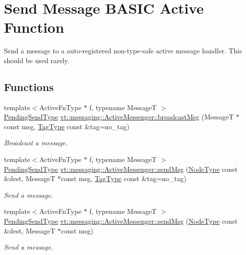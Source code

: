 \hypertarget{group__basicsend}{}\section{Send Message B\+A\+S\+IC Active Function}
\label{group__basicsend}


Send a message to a auto-\/registered non-\/type-\/safe active message handler. This should be used rarely.  


\subsection*{Functions}
\begin{DoxyCompactItemize}
\item 
{\footnotesize template$<$Active\+Fn\+Type $\ast$ f, typename MessageT $>$ }\\\hyperlink{structvt_1_1messaging_1_1_active_messenger_a3626a6ca76d8ad4ec7c3b47a2c70d3a8}{Pending\+Send\+Type} \hyperlink{group__basicsend_gaa5b764aaa06e9c9141b04f6d8a420d43}{vt\+::messaging\+::\+Active\+Messenger\+::broadcast\+Msg} (MessageT $\ast$const msg, \hyperlink{namespacevt_a84ab281dae04a52a4b243d6bf62d0e52}{Tag\+Type} const \&tag=no\+\_\+tag)
\begin{DoxyCompactList}\small\item\em Broadcast a message. \end{DoxyCompactList}\item 
{\footnotesize template$<$Active\+Fn\+Type $\ast$ f, typename MessageT $>$ }\\\hyperlink{structvt_1_1messaging_1_1_active_messenger_a3626a6ca76d8ad4ec7c3b47a2c70d3a8}{Pending\+Send\+Type} \hyperlink{group__basicsend_ga13e2d0b763ed5baac91fb86472d39f5e}{vt\+::messaging\+::\+Active\+Messenger\+::send\+Msg} (\hyperlink{namespacevt_a866da9d0efc19c0a1ce79e9e492f47e2}{Node\+Type} const \&dest, MessageT $\ast$const msg, \hyperlink{namespacevt_a84ab281dae04a52a4b243d6bf62d0e52}{Tag\+Type} const \&tag=no\+\_\+tag)
\begin{DoxyCompactList}\small\item\em Send a message. \end{DoxyCompactList}\item 
{\footnotesize template$<$Active\+Fn\+Type $\ast$ f, typename MessageT $>$ }\\\hyperlink{structvt_1_1messaging_1_1_active_messenger_a3626a6ca76d8ad4ec7c3b47a2c70d3a8}{Pending\+Send\+Type} \hyperlink{group__basicsend_ga6fe7fc2545ccc779bb6e35f7c0032691}{vt\+::messaging\+::\+Active\+Messenger\+::send\+Msg} (\hyperlink{namespacevt_a866da9d0efc19c0a1ce79e9e492f47e2}{Node\+Type} const \&dest, MessageT $\ast$const msg)
\begin{DoxyCompactList}\small\item\em Send a message. \end{DoxyCompactList}\end{DoxyCompactItemize}


